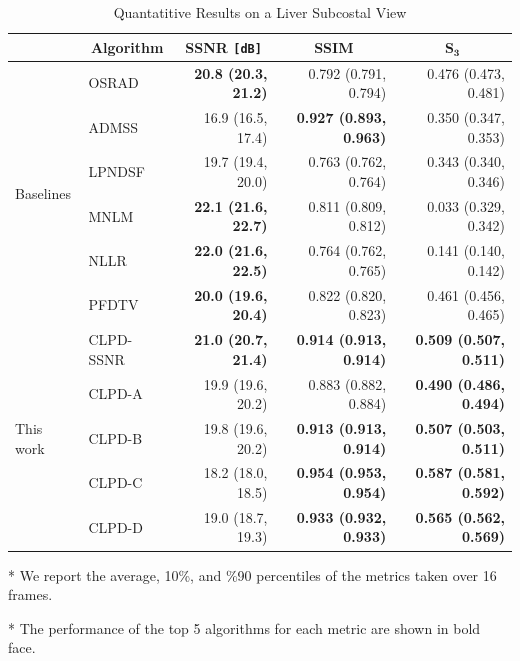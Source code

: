 
%
\begin{table}
  \centering
  \caption{Quantatitive Results on a Liver Subcostal View}\label{table:liver1}
  \begin{threeparttable}
  \setlength{\tabcolsep}{3.5pt}
  \begin{tabular}{llrrr}
    \toprule
    & \multicolumn{1}{c}{\textbf{Algorithm}}
    & \multicolumn{1}{c}{\textbf{SSNR} \texttt{[dB]}}
    & \multicolumn{1}{c}{\textbf{SSIM}}
    & \multicolumn{1}{c}{\(\mathbf{S_{3}}\)} \\\midrule
    \multirow{6}{*}{\footnotesize{Baselines}} & OSRAD & \textbf{20.8 {\tiny(20.3, 21.2)}} & 0.792 {\tiny(0.791, 0.794)} & 0.476 {\tiny(0.473, 0.481)}\\
    & ADMSS & 16.9 {\tiny(16.5, 17.4)} & \textbf{0.927 {\tiny(0.893, 0.963)}} & 0.350 {\tiny(0.347, 0.353)} \\
    & LPNDSF & 19.7 {\tiny(19.4, 20.0)} & 0.763 {\tiny(0.762, 0.764)}         & 0.343 {\tiny(0.340, 0.346)} \\
    & MNLM & \textbf{22.1 {\tiny(21.6, 22.7)}} & 0.811 {\tiny(0.809, 0.812)}  & 0.033 {\tiny(0.329, 0.342)} \\
    & NLLR & \textbf{22.0 {\tiny(21.6, 22.5)}} & 0.764 {\tiny(0.762, 0.765)}  & 0.141 {\tiny(0.140, 0.142)} \\
    & PFDTV & \textbf{20.0 {\tiny(19.6, 20.4)}} & 0.822 {\tiny(0.820, 0.823)} & 0.461 {\tiny(0.456, 0.465)} \\
    \midrule
    \multirow{5}{*}{\footnotesize{This work}} & CLPD-{\scriptsize{SSNR}}  & \textbf{21.0 {\tiny(20.7, 21.4)}} & \textbf{0.914 {\tiny(0.913, 0.914)}} & \textbf{0.509 {\tiny(0.507, 0.511)}} \\
    & CLPD-A  & 19.9 {\tiny(19.6, 20.2)} & 0.883 {\tiny(0.882, 0.884)} & \textbf{0.490 {\tiny(0.486, 0.494)}} \\
    & CLPD-B  & 19.8 {\tiny(19.6, 20.2)} & \textbf{0.913 {\tiny(0.913, 0.914)}} & \textbf{0.507 {\tiny(0.503, 0.511)}} \\
    & CLPD-C  & 18.2 {\tiny(18.0, 18.5)} & \textbf{0.954 {\tiny(0.953, 0.954)}} & \textbf{0.587 {\tiny(0.581, 0.592)}} \\
    & CLPD-D & 19.0 {\tiny(18.7, 19.3)} & \textbf{0.933 {\tiny(0.932, 0.933)}} &  \textbf{0.565 {\tiny(0.562, 0.569)}} \\\bottomrule
  \end{tabular}
  \begin{tablenotes}
    \item[*] We report the average, 10\%, and \%90 percentiles of the metrics taken over 16 frames.
    \item[*] The performance of the top 5 algorithms for each metric are shown in bold face.
  \end{tablenotes}
  \end{threeparttable}
\end{table}
%
